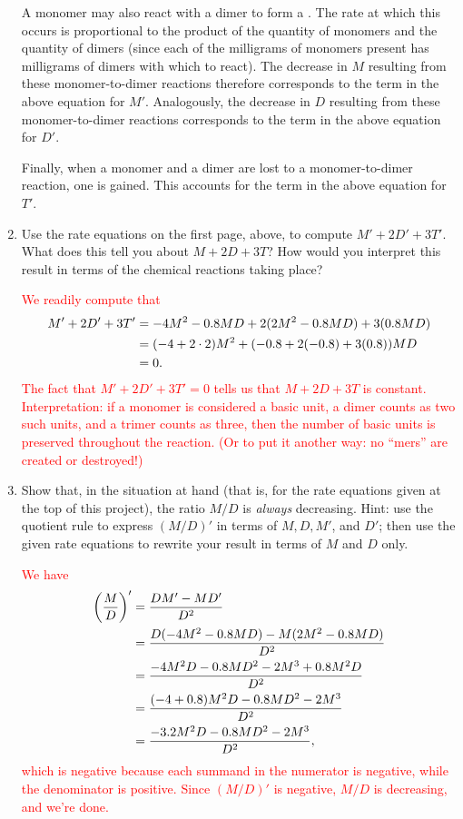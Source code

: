 \documentclass[12pt]{article}
\newcommand{\sol}[1]{\textcolor{red}{#1}}
\newcommand{\ans}[1]{\underbar{\qquad \textcolor{red}{#1} \qquad}}
\newcommand{\sol}[1]{\textcolor{white}{#1}}
\newcommand{\ans}[1]{\underbar{\qquad \textcolor{white}{#1} \qquad}}
\begin{document}
\begin{enumerate}
A monomer may also react with a dimer to form a \ans{trimer}.  The rate at which this occurs is proportional to the product of the quantity of monomers and the quantity of dimers (since each of the \ans{$M$} milligrams of monomers present has  \ans{$D$} milligrams of dimers with which to react).   The decrease in $M$ resulting from these monomer-to-dimer reactions therefore corresponds to the term \ans{$-0.8MD$} in the above equation for $M'$. Analogously, the decrease in $D$ resulting from these monomer-to-dimer reactions corresponds to the term \ans{$-0.8MD$} in the above equation for $D'$. 

Finally, when  a monomer and a dimer are lost to a monomer-to-dimer reaction, one \ans{trimer} is gained.  This accounts for the term \ans{$0.8M D$} in the above equation for $T'$.  
 

\item  Use the rate equations on the first page, above, to compute $M'+2D'+3T'$.  What does this tell you about $M+2D+3T$?  How would you interpret this result in terms of the chemical reactions taking place?

 \medskip \sol{We readily compute that $$\aligned M'+2D'+3T'&=-4M^2-0.8 M D+2( 2M^2-0.8 M D)+3(0.8 M D)\\&=(-4+2\cdot2)M^2+(-0.8+2(-0.8)+3(0.8))MD\\&=0.\endaligned$$
\vspace{.1 in}
The fact that $M'+2D'+3T'=0$ tells us that $M+2D+3T$ is constant.  
\vspace{.1 in}
Interpretation:  if a monomer is considered a basic unit, a dimer counts as two such units, and  a trimer counts as three, then the number of basic units is preserved throughout the reaction.   (Or to put it another way:  no ``mers'' are created or destroyed!)}

\vfill\eject\null\vskip2in\item    Show that, in the situation at hand  (that is, for the rate equations given at the top of this project), the ratio $M/D$ is {\it always} decreasing.  Hint:  use the quotient rule to express $(M/D)'$ in terms of $M,D,M'$, and $D'$; then use the given rate equations to rewrite your result in terms of $M$ and $D$ only.

\sol{ We have $$\aligned \biggl(\frac{M}{D}\biggr)'&=\frac{D M'-M D'}{D^2}\\&=\frac{D (-4M^2-0.8 M D)-M (2M^2-0.8 M D)}{D^2}\\&=\frac{  -4M^2D-0.8 M D^2- 2M^3+0.8 M^2 D}{D^2}\\&=\frac{  (-4+0.8)M^2D-0.8 M D^2- 2M^3 }{D^2}
\\&=\frac{  -3.2M^2D-0.8 M D^2- 2M^3 }{D^2},\endaligned$$ which is negative because each summand in the numerator is negative, while the denominator is positive.  Since $(M/D)'$ is negative, $M/D$ is decreasing, and we're done.}

\end{enumerate}
\end{document}
